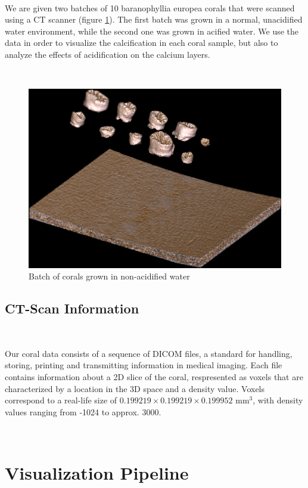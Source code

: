 \documentclass[12pt]{article}
\begin{document}
\

We are given two batches of 10 baranophyllia europea corals that were scanned using a CT scanner (figure \ref{fig:1}). The first batch was grown in a normal, unacidified water environment, while the second one was grown in acified water. We use the data in order to visualize the calcification in each coral sample, but also to analyze the effects of acidification on the calcium layers.

\

\begin{figure}[!h]
\centering
\includegraphics[scale=0.4]{Batches.jpg}
\caption{Batch of corals grown in non-acidified water}
\label{fig:1}
\end{figure}

\subsection{CT-Scan Information}

\

Our coral data consists of a sequence of DICOM files, a standard for handling, storing, printing and transmitting information in medical imaging. Each file contains information about a 2D slice of the coral, respresented as voxels that are characterized by a location in the 3D space and a density value. Voxels correspond to a real-life size of $0.199219 \times 0.199219 \times 0.199952$ mm$^3$, with density values ranging from -1024 to approx. 3000.

\

\section{Visualization Pipeline}
\end{document}
